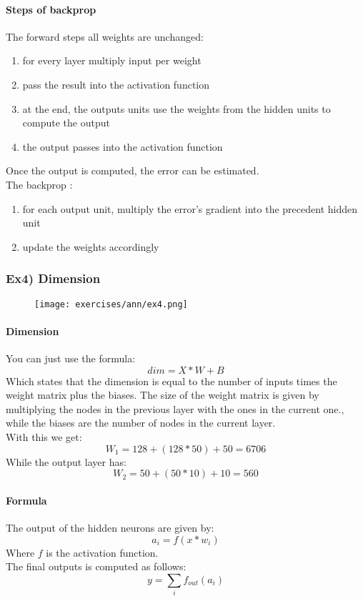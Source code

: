 \paragraph{Steps of backprop}
The forward steps all weights are unchanged:
\begin{enumerate}
\item for every layer multiply input per weight
\item pass the result into the activation function
\item at the end, the outputs units use the weights from the hidden units to compute the output
\item the output passes into the activation function
\end{enumerate}
Once the output is computed, the error can be estimated.\\
The backprop :
\begin{enumerate}
\item for each output unit, multiply the error's gradient into the precedent hidden unit
\item update the weights accordingly
\end{enumerate}

\subsubsection{Ex4) Dimension}

\begin{figure}[H]
    \centering
    \texttt{[image: exercises/ann/ex4.png]}
\end{figure}

\paragraph{Dimension}
You can just use the formula:
$$dim=X*W+B$$
Which states that the dimension is equal to the number of inputs times the weight matrix plus the biases.
The size of the weight matrix is given by multiplying the nodes in the previous layer with the ones in the current one., while the biases are the number of nodes in the current layer.\\
With this we get:
$$W_1=128+(128*50)+50=6706$$
While the output layer has:
$$W_2=50+(50*10)+10=560$$

\paragraph{Formula}
The output of the hidden neurons are given by:
$$a_i=f(x*w_i)$$
Where $f$ is the activation function.\\
The final outputs is computed as follows:
$$y=\sum_i f_{out}(a_i)$$

